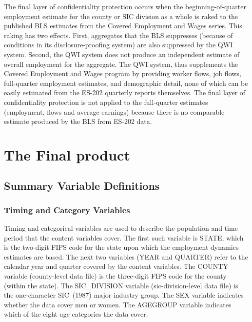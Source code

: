 The final layer of confidentiality protection occurs when the
beginning-of-quarter employment estimate for the county or %
SIC division as a whole is raked to the published BLS
estimates from the Covered Employment and Wages%
 series. This raking has two
effects. First, aggregates that the BLS suppresses (because of
conditions in its disclosure-proofing system) are also suppressed by the QWI
system. Second, the QWI system does not produce an independent estimate of
overall employment for the aggregate. The QWI system, thus supplements the
Covered Employment and Wages program by providing worker flows, job flows,
full-quarter employment estimates, and demographic detail, none of which can
be easily estimated from the ES-202%
 quarterly reports themselves. The final layer of
confidentiality protection is not applied to the full-quarter estimates
(employment, flows and average earnings) because there is no comparable
estimate produced by the BLS from ES-202 data.


\section{The Final product}
\label{sec:final}

\subsection{Summary Variable Definitions}

\subsubsection{Timing and Category Variables}

 

Timing and categorical variables are used to describe the population and
time period that the content variables cover. The first such variable is 
\textsf{STATE}, which is the two-digit FIPS%
 code for the state upon which the employment dynamics estimates
are based. The next two variables (\textsf{YEAR} and \textsf{%
QUARTER}) refer to the calendar year and quarter covered by
the content variables. The \textsf{COUNTY} variable
(county-level data file) is the three-digit FIPS%
 code for the county (within the state). The \textsf{%
SIC\_DIVISION} variable (sic-division-level data file)
is the one-character SIC\ (1987) major industry group. The \textsf{SEX}%
 variable indicates whether the data cover men or women. The 
\textsf{AGEGROUP} variable indicates which of the eight age
categories the data cover.

